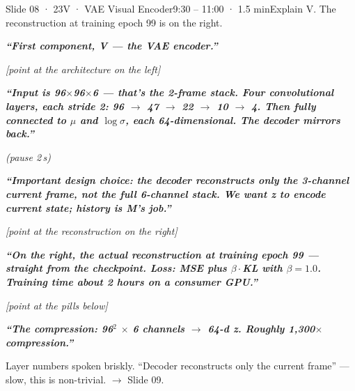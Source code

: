 \documentclass[11pt,a4paper]{article}
\newcommand{\say}[1]{%
    \par\vspace{0.3em}%
    \begingroup
    \leftskip=12pt
    \rightskip=8pt
    \color{thStrong}%
    \itshape\textbf{“#1”}%
    \par
    \endgroup
    \vspace{0.2em}
}
\newcommand{\beat}[1][2]{%
    \par\textcolor{thMuted}{\small\textit{(pause #1\,s)}}\par
    \vspace{0.2em}
}
\newcommand{\stage}[1]{%
    \par\textcolor{thMuted}{\small\textit{[#1]}}\par
    \vspace{0.2em}
}
\newcommand{\emphw}[1]{\textbf{\textcolor{thAmber}{#1}}}
\begin{document}
\begin{slide}{Slide 08 · 23}{V · VAE Visual Encoder}{9:30 – 11:00 · 1.5 min}{Explain V. The reconstruction at training epoch 99 is on the right.}
\say{First component, V — the VAE encoder.}

\stage{point at the architecture on the left}

\say{Input is 96$\times$96$\times$6 — that's the 2-frame stack. Four convolutional layers, each stride 2: 96 $\rightarrow$ 47 $\rightarrow$ 22 $\rightarrow$ 10 $\rightarrow$ 4. Then fully connected to $\mu$ and $\log\sigma$, each 64-dimensional. The decoder mirrors back.}
\beat
\say{\emphw{Important design choice}: the decoder reconstructs only the \textbf{3-channel current frame}, not the full 6-channel stack. We want z to encode \emph{current} state; history is M's job.}

\stage{point at the reconstruction on the right}

\say{On the right, the \emphw{actual reconstruction at training epoch 99} — straight from the checkpoint. Loss: MSE plus $\beta \cdot$KL with $\beta = 1.0$. Training time about 2 hours on a consumer GPU.}

\stage{point at the pills below}

\say{The compression: 96$^2$ $\times$ 6 channels $\rightarrow$ 64-d z. Roughly \textbf{1{,}300$\times$ compression}.}

\begin{stagebox}
Layer numbers spoken briskly. ``Decoder reconstructs only the current frame'' — slow, this is non-trivial. $\rightarrow$ Slide 09.
\end{stagebox}
\end{slide}
\end{document}
